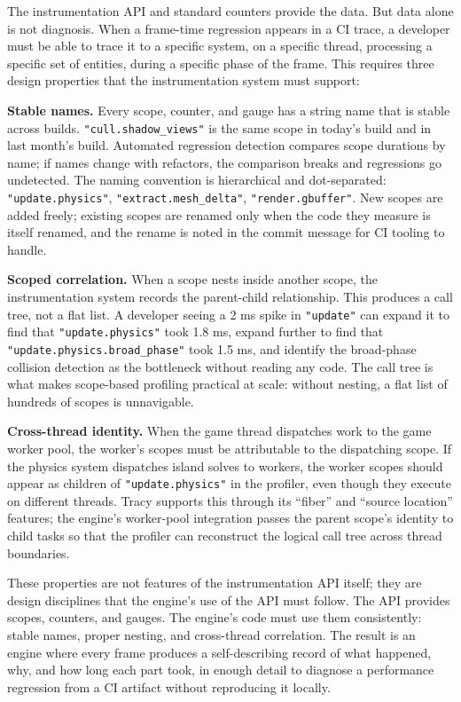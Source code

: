\documentclass[
  11pt,
  letterpaper,
  DIV=11,
  numbers=noendperiod,
  twoside,
  open=right]{scrreprt}
\begin{document}
The instrumentation API and standard counters provide the data. But data
alone is not diagnosis. When a frame-time regression appears in a CI
trace, a developer must be able to trace it to a specific system, on a
specific thread, processing a specific set of entities, during a
specific phase of the frame. This requires three design properties that
the instrumentation system must support:

\textbf{Stable names.} Every scope, counter, and gauge has a string name
that is stable across builds. \texttt{"cull.shadow\_views"} is the same
scope in today's build and in last month's build. Automated regression
detection compares scope durations by name; if names change with
refactors, the comparison breaks and regressions go undetected. The
naming convention is hierarchical and dot-separated:
\texttt{"update.physics"}, \texttt{"extract.mesh\_delta"},
\texttt{"render.gbuffer"}. New scopes are added freely; existing scopes
are renamed only when the code they measure is itself renamed, and the
rename is noted in the commit message for CI tooling to handle.

\textbf{Scoped correlation.} When a scope nests inside another scope,
the instrumentation system records the parent-child relationship. This
produces a call tree, not a flat list. A developer seeing a 2 ms spike
in \texttt{"update"} can expand it to find that
\texttt{"update.physics"} took 1.8 ms, expand further to find that
\texttt{"update.physics.broad\_phase"} took 1.5 ms, and identify the
broad-phase collision detection as the bottleneck without reading any
code. The call tree is what makes scope-based profiling practical at
scale: without nesting, a flat list of hundreds of scopes is
unnavigable.

\textbf{Cross-thread identity.} When the game thread dispatches work to
the game worker pool, the worker's scopes must be attributable to the
dispatching scope. If the physics system dispatches island solves to
workers, the worker scopes should appear as children of
\texttt{"update.physics"} in the profiler, even though they execute on
different threads. Tracy supports this through its ``fiber'' and
``source location'' features; the engine's worker-pool integration
passes the parent scope's identity to child tasks so that the profiler
can reconstruct the logical call tree across thread boundaries.

These properties are not features of the instrumentation API itself;
they are design disciplines that the engine's use of the API must
follow. The API provides scopes, counters, and gauges. The engine's code
must use them consistently: stable names, proper nesting, and
cross-thread correlation. The result is an engine where every frame
produces a self-describing record of what happened, why, and how long
each part took, in enough detail to diagnose a performance regression
from a CI artifact without reproducing it locally.
\end{document}
